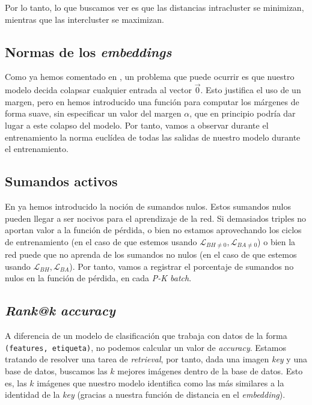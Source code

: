 Por lo tanto, lo que buscamos ver es que las distancias intracluster se minimizan, mientras que las intercluster se maximizan.

\subsection{Normas de los \textit{embeddings}} \label{isubs:normas_embeddings}

Como ya hemos comentado en , un problema que puede ocurrir es que nuestro modelo decida colapsar cualquier entrada al vector $\vec{0}$. Esto justifica el uso de un margen, pero en  hemos introducido una función para computar los márgenes de forma suave, sin especificar un valor del margen $\alpha$, que en principio podría dar lugar a este colapso del modelo. Por tanto, vamos a observar durante el entrenamiento la norma euclídea de todas las salidas de nuestro modelo durante el entrenamiento.

\subsection{Sumandos activos}

En  ya hemos introducido la noción de sumandos nulos. Estos sumandos nulos pueden llegar a ser nocivos para el aprendizaje de la red. Si demasiados triples no aportan valor a la función de pérdida, o bien no estamos aprovechando los ciclos de entrenamiento (en el caso de que estemos usando $\mathcal{L}_{BH \neq 0}, \mathcal{L}_{BA \neq 0}$) o bien  la red puede que no aprenda de los sumandos no nulos (en el caso de que estemos usando $\mathcal{L}_{BH}, \mathcal{L}_{BA}$). Por tanto, vamos a registrar el porcentaje de sumandos no nulos en la función de pérdida, en cada \textit{P-K batch}.

\subsection{\textit{Rank@k accuracy}} \label{isubs:rank_at_k}

A diferencia de un modelo de clasificación que trabaja con datos de la forma \lstinline{(features, etiqueta)}, no podemos calcular un valor de \textit{accuracy}. Estamos tratando de resolver una tarea de \textit{retrieval}, por tanto, dada una imagen \textit{key} y una base de datos, buscamos las $k$  mejores imágenes dentro de la base de datos. Esto es, las $k$ imágenes que nuestro modelo identifica como las más similares a la identidad de la \textit{key} (gracias a nuestra función de distancia en el \textit{embedding}).

